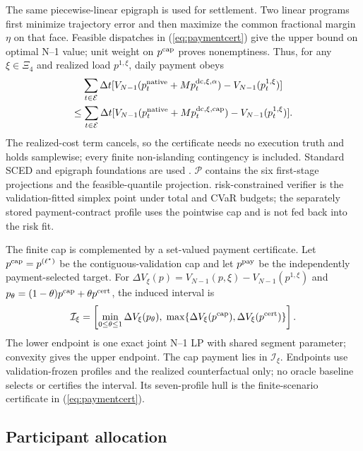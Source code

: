 \documentclass[10pt,journal]{IEEEtran}
\newcommand{\RiskSafe}{risk-constrained verifier}
\newcommand{\dt}{\Delta t}
\begin{document}
The same piecewise-linear epigraph is used for settlement. Two linear programs
first minimize trajectory error and then maximize the common fractional margin
$\eta$ on that face. Feasible dispatches in (\ref{eq:paymentcert}) give the
upper bound on optimal N--1 value; unit weight on $p^{\rm cap}$ proves
nonemptiness. Thus, for any $\xi\in\Xi_4$ and realized load $p^{1,\xi}$,
daily payment obeys
\begin{multline}
\sum_{t\in\mathcal E}\dt
[V_{N-1}(p_t^{\rm native}+M p_t^{\rm dc,\xi,\alpha})
-V_{N-1}(p^{1,\xi}_t)]\\
\leq\sum_{t\in\mathcal E}\dt
[V_{N-1}(p_t^{\rm native}+M p_t^{\rm dc,\xi,cap})
-V_{N-1}(p^{1,\xi}_t)].
\label{eq:paymentdominance}
\end{multline}
The realized-cost term cancels, so the certificate needs no execution truth and
holds samplewise; every finite non-islanding contingency is included. Standard
SCED and epigraph foundations are used \cite{zimmerman2011matpower,boyd2004convex}.
$\mathcal P$ contains the six first-stage projections and the feasible-quantile
projection. \RiskSafe{} is the validation-fitted simplex point under total and
CVaR budgets; the separately stored payment-contract profile uses the
pointwise cap and is not fed back into the risk fit.

The finite cap is complemented by a set-valued payment certificate. Let
$p^{\rm cap}=p^{(\ell^\star)}$ be the contiguous-validation cap and let
$p^{\rm pay}$ be the independently payment-selected target. For
$\Delta V_\xi(p)=V_{N-1}(p,\xi)-V_{N-1}(p^{1,\xi})$ and
$p_\theta=(1-\theta)p^{\rm cap}+\theta p^{\rm cert}$, the induced interval is
 \begin{equation}
  \mathcal I_\xi=\left[
  \min_{0\leq\theta\leq1}\Delta V_\xi(p_\theta),\;
  \max\{\Delta V_\xi(p^{\rm cap}),\Delta V_\xi(p^{\rm cert})\}\right].
  \label{eq:paymentinterval}
 \end{equation}
The lower endpoint is one exact joint N--1 LP with shared segment parameter;
convexity gives the upper endpoint. The cap payment lies in $\mathcal I_\xi$.
Endpoints use validation-frozen profiles and the realized counterfactual only;
no oracle baseline selects or certifies the interval. Its seven-profile hull
is the finite-scenario certificate in (\ref{eq:paymentcert}).

\subsection{Participant allocation}
\end{document}
